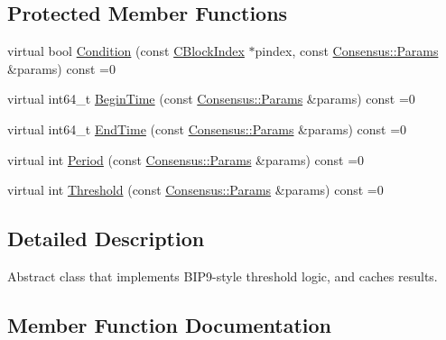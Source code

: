 \subsection*{Protected Member Functions}
\begin{DoxyCompactItemize}
\item 
virtual bool \mbox{\hyperlink{class_abstract_threshold_condition_checker_a242388d3046f69956904f0ea7a1e92ee}{Condition}} (const \mbox{\hyperlink{class_c_block_index}{C\+Block\+Index}} $\ast$pindex, const \mbox{\hyperlink{chainparams_8h_a5e1ca1b35c3dd1a4e20f18445f28dd9c}{Consensus\+::\+Params}} \&params) const =0
\item 
virtual int64\+\_\+t \mbox{\hyperlink{class_abstract_threshold_condition_checker_abd1169fade7a2934d605bc4fa53878c6}{Begin\+Time}} (const \mbox{\hyperlink{chainparams_8h_a5e1ca1b35c3dd1a4e20f18445f28dd9c}{Consensus\+::\+Params}} \&params) const =0
\item 
virtual int64\+\_\+t \mbox{\hyperlink{class_abstract_threshold_condition_checker_a798df83d41a24e8ca12c02fb25d07c1c}{End\+Time}} (const \mbox{\hyperlink{chainparams_8h_a5e1ca1b35c3dd1a4e20f18445f28dd9c}{Consensus\+::\+Params}} \&params) const =0
\item 
virtual int \mbox{\hyperlink{class_abstract_threshold_condition_checker_a34b66faf36426413918aedda5213d110}{Period}} (const \mbox{\hyperlink{chainparams_8h_a5e1ca1b35c3dd1a4e20f18445f28dd9c}{Consensus\+::\+Params}} \&params) const =0
\item 
virtual int \mbox{\hyperlink{class_abstract_threshold_condition_checker_ad01c87d6d551e9d801661d734a270a6c}{Threshold}} (const \mbox{\hyperlink{chainparams_8h_a5e1ca1b35c3dd1a4e20f18445f28dd9c}{Consensus\+::\+Params}} \&params) const =0
\end{DoxyCompactItemize}


\subsection{Detailed Description}
Abstract class that implements B\+I\+P9-\/style threshold logic, and caches results. 

\subsection{Member Function Documentation}
\mbox{\label{class_abstract_threshold_condition_checker_abd1169fade7a2934d605bc4fa53878c6}} 
